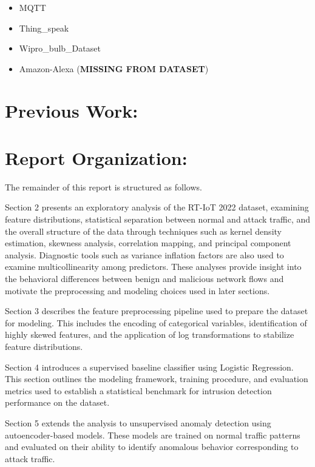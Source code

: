 \documentclass[
  8pt,
  letterpaper,
  DIV=11,
  numbers=noendperiod]{scrreprt}
\providecommand{\tightlist}{%
  \setlength{\itemsep}{0pt}\setlength{\parskip}{0pt}}
\begin{document}
\begin{enumerate}
\begin{itemize}
    \begin{itemize}
    \tightlist
    \item
      MQTT
    \item
      Thing\_speak
    \item
      Wipro\_bulb\_Dataset
    \item
      Amazon-Alexa (\textbf{MISSING FROM DATASET})
    \end{itemize}
  \end{itemize}
\end{enumerate}

\section{Previous Work:}\label{previous-work}

\section{Report Organization:}\label{report-organization}

The remainder of this report is structured as follows.

Section 2 presents an exploratory analysis of the RT-IoT 2022 dataset,
examining feature distributions, statistical separation between normal
and attack traffic, and the overall structure of the data through
techniques such as kernel density estimation, skewness analysis,
correlation mapping, and principal component analysis. Diagnostic tools
such as variance inflation factors are also used to examine
multicollinearity among predictors. These analyses provide insight into
the behavioral differences between benign and malicious network flows
and motivate the preprocessing and modeling choices used in later
sections.

Section 3 describes the feature preprocessing pipeline used to prepare
the dataset for modeling. This includes the encoding of categorical
variables, identification of highly skewed features, and the application
of log transformations to stabilize feature distributions.

Section 4 introduces a supervised baseline classifier using Logistic
Regression. This section outlines the modeling framework, training
procedure, and evaluation metrics used to establish a statistical
benchmark for intrusion detection performance on the dataset.

Section 5 extends the analysis to unsupervised anomaly detection using
autoencoder-based models. These models are trained on normal traffic
patterns and evaluated on their ability to identify anomalous behavior
corresponding to attack traffic.
\end{document}
